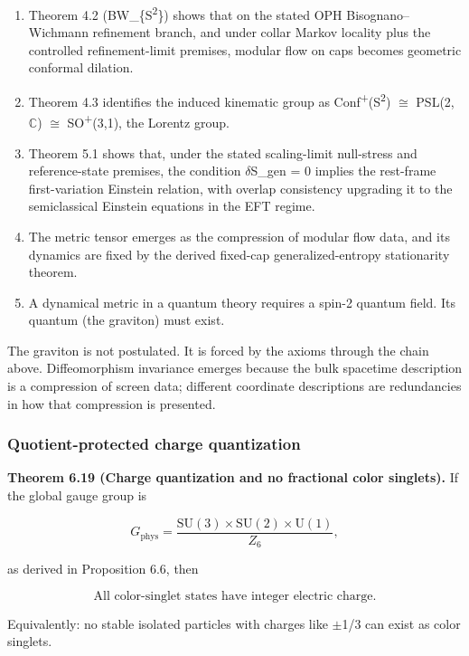 \begin{enumerate}
\def\labelenumi{\arabic{enumi}.}
\tightlist
\item
  Theorem 4.2 (BW\_\{S\textsuperscript{2}\}) shows that on the stated OPH Bisognano--Wichmann refinement branch, and under collar Markov locality plus the controlled refinement-limit premises, modular flow on caps becomes geometric conformal dilation.
\item
  Theorem 4.3 identifies the induced kinematic group as Conf\textsuperscript{+}(S\textsuperscript{2}) \ensuremath{\cong} PSL(2,\ensuremath{\mathbb{C}}) \ensuremath{\cong} SO\textsuperscript{+}(3,1), the Lorentz group.
\item
  Theorem 5.1 shows that, under the stated scaling-limit null-stress and reference-state premises, the condition \ensuremath{\delta}S\_gen = 0 implies the rest-frame first-variation Einstein relation, with overlap consistency upgrading it to the semiclassical Einstein equations in the EFT regime.
\item
  The metric tensor emerges as the compression of modular flow data, and its dynamics are fixed by the derived fixed-cap generalized-entropy stationarity theorem.
\item
  A dynamical metric in a quantum theory requires a spin-2 quantum field. Its quantum (the graviton) must exist.
\end{enumerate}

The graviton is not postulated. It is forced by the axioms through the chain above. Diffeomorphism invariance emerges because the bulk spacetime description is a compression of screen data; different coordinate descriptions are redundancies in how that compression is presented.

\subsubsection{Quotient-protected charge quantization}\label{612-mass-predictions-from-symmetry}

\textbf{Theorem 6.19 (Charge quantization and no fractional color singlets).} If the global gauge group is

\[
G_{\mathrm{phys}} = \frac{\mathrm{SU}(3) \times \mathrm{SU}(2) \times \mathrm{U}(1)}{Z_6},
\]

as derived in Proposition 6.6, then

\[
\text{All color-singlet states have integer electric charge.}
\]

Equivalently: no stable isolated particles with charges like \ensuremath{\pm}1/3 can exist as color singlets.

